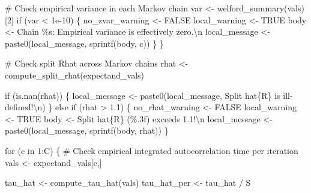 \documentclass[
  letterpaper,
  DIV=11,
  numbers=noendperiod]{scrartcl}
\newenvironment{Shaded}{\begin{snugshade}}{\end{snugshade}}
\newcommand{\CharTok}[1]{\textcolor[rgb]{0.13,0.47,0.30}{#1}}
\newcommand{\CommentTok}[1]{\textcolor[rgb]{0.37,0.37,0.37}{#1}}
\newcommand{\ControlFlowTok}[1]{\textcolor[rgb]{0.00,0.23,0.31}{#1}}
\newcommand{\DecValTok}[1]{\textcolor[rgb]{0.68,0.00,0.00}{#1}}
\newcommand{\FloatTok}[1]{\textcolor[rgb]{0.68,0.00,0.00}{#1}}
\newcommand{\KeywordTok}[1]{\textcolor[rgb]{0.00,0.23,0.31}{#1}}
\newcommand{\NormalTok}[1]{\textcolor[rgb]{0.00,0.23,0.31}{#1}}
\newcommand{\OperatorTok}[1]{\textcolor[rgb]{0.37,0.37,0.37}{#1}}
\newcommand{\SpecialCharTok}[1]{\textcolor[rgb]{0.37,0.37,0.37}{#1}}
\newcommand{\StringTok}[1]{\textcolor[rgb]{0.13,0.47,0.30}{#1}}
\begin{document}
\begin{Shaded}
\begin{Highlighting}[]
      \CommentTok{\# Check empirical variance in each Markov chain}
\NormalTok{      var }\OperatorTok{\textless{}{-}}\NormalTok{ welford\_summary(vals)[}\DecValTok{2}\NormalTok{]}
      \ControlFlowTok{if}\NormalTok{ (var }\OperatorTok{\textless{}} \FloatTok{1e{-}10}\NormalTok{) \{}
\NormalTok{        no\_zvar\_warning }\OperatorTok{\textless{}{-}}\NormalTok{ FALSE}
\NormalTok{        local\_warning }\OperatorTok{\textless{}{-}}\NormalTok{ TRUE}
\NormalTok{        body }\OperatorTok{\textless{}{-}} \StringTok{\textquotesingle{}  Chain }\SpecialCharTok{\%s}\StringTok{: Empirical variance is effectively zero.}\CharTok{\textbackslash{}n}\StringTok{\textquotesingle{}}
\NormalTok{        local\_message }\OperatorTok{\textless{}{-}}\NormalTok{ paste0(local\_message, sprintf(body, c))}
\NormalTok{      \}}
\NormalTok{    \}}
  
    \CommentTok{\# Check split Rhat across Markov chains}
\NormalTok{    rhat }\OperatorTok{\textless{}{-}}\NormalTok{ compute\_split\_rhat(expectand\_vals)}

    \ControlFlowTok{if}\NormalTok{ (}\KeywordTok{is}\NormalTok{.nan(rhat)) \{}
\NormalTok{      local\_message }\OperatorTok{\textless{}{-}}\NormalTok{ paste0(local\_message,}
                              \StringTok{\textquotesingle{}  Split hat}\SpecialCharTok{\{R\}}\StringTok{ is ill{-}defined!}\CharTok{\textbackslash{}n}\StringTok{\textquotesingle{}}\NormalTok{)}
\NormalTok{    \} }\ControlFlowTok{else} \ControlFlowTok{if}\NormalTok{ (rhat }\OperatorTok{\textgreater{}} \FloatTok{1.1}\NormalTok{) \{}
\NormalTok{      no\_rhat\_warning }\OperatorTok{\textless{}{-}}\NormalTok{ FALSE}
\NormalTok{      local\_warning }\OperatorTok{\textless{}{-}}\NormalTok{ TRUE}
\NormalTok{      body }\OperatorTok{\textless{}{-}} \StringTok{\textquotesingle{}  Split hat}\SpecialCharTok{\{R\}}\StringTok{ (}\SpecialCharTok{\%.3f}\StringTok{) exceeds 1.1!}\CharTok{\textbackslash{}n}\StringTok{\textquotesingle{}}
\NormalTok{      local\_message }\OperatorTok{\textless{}{-}}\NormalTok{ paste0(local\_message, sprintf(body, rhat))}
\NormalTok{    \}}

    \ControlFlowTok{for}\NormalTok{ (c }\KeywordTok{in} \DecValTok{1}\NormalTok{:C) \{}
      \CommentTok{\# Check empirical integrated autocorrelation time per iteration}
\NormalTok{      vals }\OperatorTok{\textless{}{-}}\NormalTok{ expectand\_vals[c,]}

\NormalTok{      tau\_hat }\OperatorTok{\textless{}{-}}\NormalTok{ compute\_tau\_hat(vals)}
\NormalTok{      tau\_hat\_per }\OperatorTok{\textless{}{-}}\NormalTok{ tau\_hat }\OperatorTok{/}\NormalTok{ S}


\end{Highlighting}
\end{Shaded}
\end{document}
